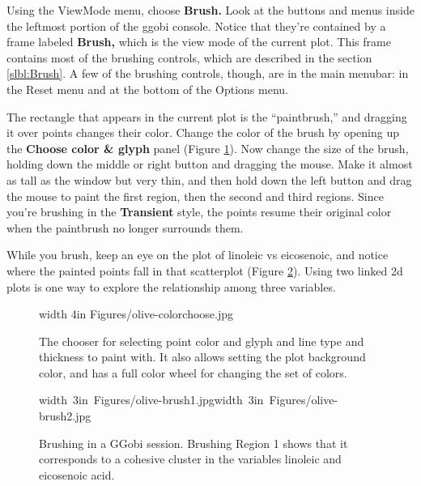 \documentclass[11pt]{article}
\begin{document}
Using the ViewMode menu, choose {\bf Brush.}  Look at the buttons and
menus inside the leftmost portion of the ggobi console.  Notice
that they're contained by a frame labeled {\bf Brush,} which is the
view mode of the current plot.  This frame contains most of the
brushing controls, which are described in the section
\ref{slbl:Brush}.  A few of the brushing controls, though, are in the
main menubar: in the Reset menu and at the bottom of the Options menu.

The rectangle that appears in the current plot is the ``paintbrush,''
and dragging it over points changes their color. Change the color of
the brush by opening up the {\bf Choose color \& glyph} panel (Figure
\ref{fig2}). Now change the size of the brush, holding down the
middle or right button and dragging the mouse.  Make it almost as
tall as the window but very thin, and then hold down the left button
and drag the mouse to  paint the first region, then the second and
third regions.  Since you're brushing in the {\bf Transient} style,
the points resume their original color when the paintbrush no longer
surrounds them.

While you brush, keep an eye on the plot of linoleic vs eicosenoic,
and notice where the painted points fall in that scatterplot (Figure
\ref{fig3}).  Using two linked 2d plots is one way to explore the
relationship among three variables.

\begin{figure}[htp]
\vspace{-0.5in}
\pdfimage width 4in {Figures/olive-colorchoose.jpg}
\caption{The chooser for selecting point color and glyph and line
type and thickness to paint with. It also allows setting the plot
background color, and has a full color wheel for changing the set of
colors.
}%
\label{fig2}
\end{figure}

\begin{figure}[htp]
\hbox{\pdfimage width 3in {Figures/olive-brush1.jpg}\pdfimage width 3in {Figures/olive-brush2.jpg}}
\caption{Brushing in a GGobi session. Brushing Region 1 shows that it
corresponds to a cohesive cluster in the variables linoleic and 
eicosenoic acid.
}%
\label{fig3}
\end{figure}
\end{document}
